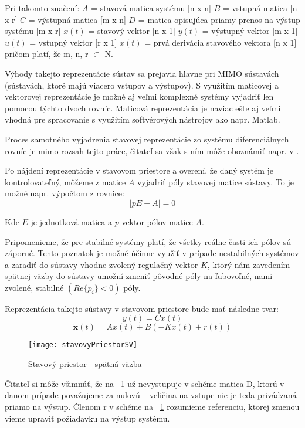 Pri takomto značení:\newline
$A$ = stavová matica systému [n x n]\newline
$B$ = vstupná matica [n x r]\newline
$C$ = výstupná matica [m x n]\newline
$D$ = matica opisujúca priamy prenos na výstup systému [m x r]\newline
$x(t)$ = stavový vektor [n x 1]\newline
$y(t)$ = výstupný vektor [m x 1]\newline
$u(t)$ = vstupný vektor [r x 1]\newline
$\dot{x}(t)$ = prvá derivácia stavového vektora [n x 1]
pričom platí, že m, n, r $\subset$ N. 

Výhody takejto reprezentácie sústav sa prejavia hlavne pri MIMO sústavách (sústavách, ktoré majú viacero vstupov a výstupov). S využitím maticovej a vektorovej reprezentácie je možné aj veľmi komplexné systémy vyjadriť len pomocou týchto dvoch rovníc. Maticová reprezentácia je naviac ešte aj veľmi vhodná pre spracovanie s využitím softvérových nástrojov ako napr. Matlab.

Proces samotného vyjadrenia stavovej reprezentácie zo systému diferenciálnych rovníc je mimo rozsah tejto práce, čitateľ sa však s ním môže oboznámiť napr. v \cite{ContSys}.

Po nájdení reprezentácie v stavovom priestore a overení, že daný systém je kontrolovateľný, môžeme z matice $A$ vyjadriť póly stavovej matice sústavy. To je možné napr. výpočtom z rovnice:
\begin{equation}
\mid pE - A \mid = 0 
\end{equation}

Kde $E$ je jednotková matica a $p$ vektor pólov matice $A$.

Pripomenieme, že pre stabilné systémy platí, že všetky reálne časti ich pólov sú záporné. Tento poznatok je možné účinne využiť v prípade nestabilných systémov a zaradiť do sústavy vhodne zvolený regulačný vektor $K$, ktorý nám zavedením spätnej väzby do sústavy umožní zmeniť pôvodné póly na ľubovoľné, nami zvolené, stabilné $(Re\{p_i\}<0)$ póly. 

Reprezentácia takejto sústavy v stavovom priestore bude mať následne tvar:
\begin{equation}
y( t ) = Cx(t)
\label{eq:ut}
\end{equation}
\begin{equation}
\dot{\textbf{x}}(t) = Ax(t) + B(-Kx(t)+r(t))
\label{eq:xDot}
\end{equation}
\begin{figure}
\centering
\texttt{[image: stavovyPriestorSV]}
\caption{Stavový priestor - spätná väzba}
\label{fig:stavovyPriestorSV}
\end{figure}
Čitateľ si môže všimnúť, že na \figurename~\ref{fig:stavovyPriestorSV} už nevystupuje v schéme matica D, ktorú v danom prípade považujeme za nulovú – veličina na vstupe nie je teda privádzaná priamo na výstup. Členom r v schéme na \figurename~\ref{fig:stavovyPriestorSV} rozumieme referenciu, ktorej zmenou vieme upraviť požiadavku na výstup systému.

